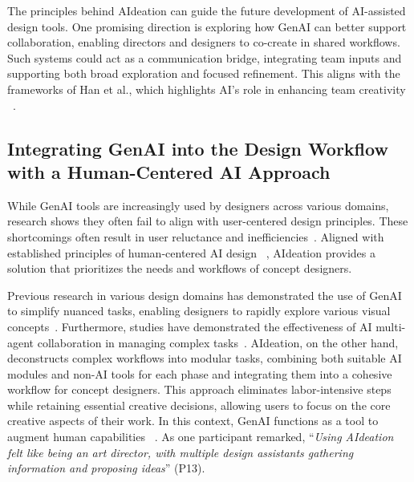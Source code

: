 The principles behind AIdeation can guide the future development of AI-assisted design tools. One promising direction is exploring how GenAI can better support collaboration, enabling directors and designers to co-create in shared workflows. Such systems could act as a communication bridge,  integrating team inputs and supporting both broad exploration and focused refinement. This aligns with the frameworks of Han et al., which highlights AI’s role in enhancing team creativity ~\cite{han2024teams}.

\subsection{Integrating GenAI into the Design Workflow with a Human-Centered AI Approach}


While GenAI tools are increasingly used by designers across various domains, research shows they often fail to align with user-centered design principles. These shortcomings often result in user reluctance and inefficiencies~\cite{vimpari2023adapt, zhang2024confrontation, mahdavi2024ai}. Aligned with established principles of human-centered AI design ~\cite{shneiderman2022human, xu2023transitioning, auernhammer2020human}, AIdeation provides a solution that prioritizes the needs and workflows of concept designers.

Previous research in various design domains has demonstrated the use of GenAI to simplify nuanced tasks, enabling designers to rapidly explore various visual concepts~\cite{wang2024roomdreaming, davis2024fashioning, oh2024lumimood}. Furthermore, studies have demonstrated the effectiveness of AI multi-agent collaboration in managing complex tasks~\cite{talebirad2023multi, de2024llmr}. 
AIdeation, on the other hand, deconstructs complex workflows into modular tasks, combining both suitable AI modules and non-AI tools for each phase and integrating them into a cohesive workflow for concept designers. This approach eliminates labor-intensive steps while retaining essential creative decisions, allowing users to focus on the core creative aspects of their work. In this context, GenAI functions as a tool to augment human capabilities ~\cite{chen2023next}. As one participant remarked, “\textit{Using AIdeation felt like being an art director, with multiple design assistants gathering information and proposing ideas}” (P13).

